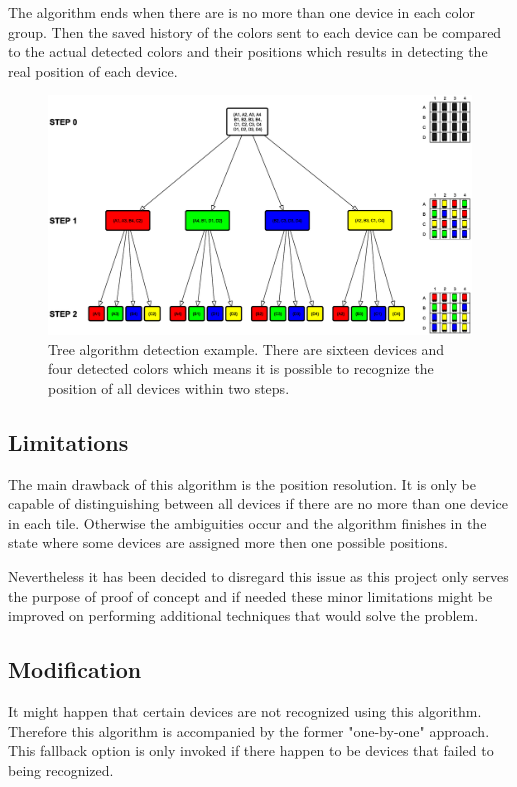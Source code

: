 The algorithm ends when there are is no more than one device in each color group. Then the saved history of the colors sent to each device can be compared to the actual detected colors and their positions which results in detecting the real position of each device.

\begin{figure}[H]
	\centering
		\includegraphics[width=18cm, angle=90]{sprint5/tree_algorithm.eps}
	\caption[Tree algorithm detection example]{Tree algorithm detection example. There are sixteen devices and four detected colors which means it is possible to recognize the position of all devices within two steps.}
	\label{fig:sprint5_tree_alg}
\end{figure}

\subsection{Limitations}
The main drawback of this algorithm is the position resolution. It is only be capable of distinguishing between all devices if there are no more than one device in each tile. Otherwise the ambiguities occur and the algorithm finishes in the state where some devices are assigned more then one possible positions.

Nevertheless it has been decided to disregard this issue as this project only serves the purpose of proof of concept and if needed these minor limitations might be improved on performing additional techniques that would solve the problem.

\subsection{Modification}
It might happen that certain devices are not recognized using this algorithm. Therefore this algorithm is accompanied by the former "one-by-one" approach. This fallback option is only invoked if there happen to be devices that failed to being recognized.

